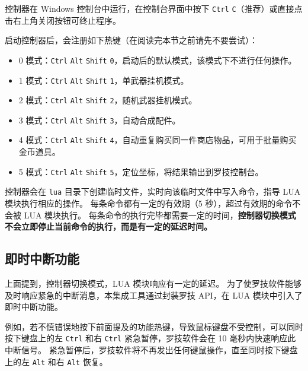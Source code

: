 控制器在 Windows 控制台中运行，在控制台界面中按下 \lstinline{Ctrl} \lstinline{C}（推荐）或直接点击右上角关闭按钮可终止程序。

启动控制器后，会注册如下热键（在阅读完本节之前请先不要尝试）：

\begin{itemize}

    \item 0 模式：\lstinline{Ctrl} \lstinline{Alt} \lstinline{Shift} \lstinline{0}，启动后的默认模式，该模式下不进行任何操作。

    \item 1 模式：\lstinline{Ctrl} \lstinline{Alt} \lstinline{Shift} \lstinline{1}，单武器挂机模式。

    \item 2 模式：\lstinline{Ctrl} \lstinline{Alt} \lstinline{Shift} \lstinline{2}，随机武器挂机模式。

    \item 3 模式：\lstinline{Ctrl} \lstinline{Alt} \lstinline{Shift} \lstinline{3}，自动合成配件。

    \item 4 模式：\lstinline{Ctrl} \lstinline{Alt} \lstinline{Shift} \lstinline{4}，自动重复购买同一件商店物品，可用于批量购买金币道具。

    \item 5 模式：\lstinline{Ctrl} \lstinline{Alt} \lstinline{Shift} \lstinline{5}，定位坐标，将结果输出到罗技控制台。

\end{itemize}

控制器会在 \lstinline{lua} 目录下创建临时文件，实时向该临时文件中写入命令，指导 LUA 模块执行相应的操作。
每条命令都有一定的有效期（5 秒），超过有效期的命令不会被 LUA 模块执行。
每条命令的执行完毕都需要一定的时间，\textbf{控制器切换模式不会立即停止当前命令的执行，而是有一定的延迟时间。}

\subsection{即时中断功能}

上面提到，控制器切换模式，LUA 模块响应有一定的延迟。
为了使罗技软件能够及时响应紧急的中断消息，本集成工具通过封装罗技 API，在 LUA 模块中引入了即时中断功能。

例如，若不慎错误地按下前面提及的功能热键，导致鼠标键盘不受控制，可以同时按下键盘上的左 \lstinline{Ctrl} 和右 \lstinline{Ctrl} 紧急暂停，罗技软件会在 10 毫秒内快速响应此中断信号。
紧急暂停后，罗技软件将不再发出任何键鼠操作，直至同时按下键盘上的左 \lstinline{Alt} 和右 \lstinline{Alt} 恢复。

